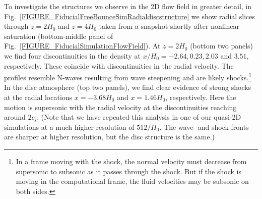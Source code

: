 \documentclass[fleqn,usenatbib]{mnras}
\begin{document}
To investigate the structures we observe in the 2D flow field in greater detail, in Fig.~\ref{FIGURE_FiducialFreeBounceSimRadialdiscstructure} we show radial slices through $z = 2H_0$ and $z = 4H_0$ taken from a snapshot shortly after nonlinear saturation (bottom-middle panel of Fig.~\ref{FIGURE_FiducialSimulationFlowField}). At $z = 2H_0$ (bottom two panels) we find four discontinuities in the density at $x/H_0 = -2.64, 0.23, 2.03$ and $3.51$, respectively. These coincide with discontinuities in the radial velocity. The profiles resemble N-waves resulting from wave steepening and are likely shocks.\footnote{In a frame moving with the shock, the normal velocity must decrease from supersonic to subsonic as it passes through the shock. But if the shock is moving in the computational frame, the fluid velocities may be subsonic on both sides.} In the disc atmosphere (top two panels), we find clear evidence of strong shocks at the radial locations $x = -3.68H_0$ and $x=1.46H_0$, respectively. Here the motion is supersonic with the radial velocity at the discontinuities reaching around $2 c_\text{s}$. (Note that we have repeated this analysis in one of our quasi-2D simulations at a much higher resolution of $512/H_0$. The wave- and shock-fronts are sharper at higher resolution, but the disc structure is the same.)
\end{document}
